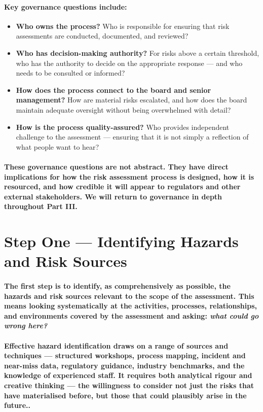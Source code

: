 \paragraph{Key governance questions include:}
\begin{itemize}
    \item{\textbf{Who owns the process?} Who is responsible for ensuring that risk assessments are conducted, documented, and reviewed?}
    \item{\textbf{Who has decision-making authority?} For risks above a certain threshold, who has the authority to decide on the appropriate response — and who needs to be consulted or informed?}
    \item{\textbf{How does the process connect to the board and senior management?} How are material risks escalated, and how does the board maintain adequate oversight without being overwhelmed with detail?}
    \item{\textbf{How is the process quality-assured?} Who provides independent challenge to the assessment — ensuring that it is not simply a reflection of what people want to hear?}
\end{itemize}
\paragraph{These governance questions are not abstract. They have direct implications for how the risk assessment process is designed, how it is resourced, and how credible it will appear to regulators and other external stakeholders. We will return to governance in depth throughout Part III.}

\section{Step One — Identifying Hazards and Risk Sources}
\paragraph{The first step is to identify, as comprehensively as possible, the hazards and risk sources relevant to the scope of the assessment. This means looking systematically at the activities, processes, relationships, and environments covered by the assessment and asking: \textit{what could go wrong here?}}
\paragraph{Effective hazard identification draws on a range of sources and techniques — structured workshops, process mapping, incident and near-miss data, regulatory guidance, industry benchmarks, and the knowledge of experienced staff. It requires both analytical rigour and creative thinking — the willingness to consider not just the risks that have materialised before, but those that could plausibly arise in the future..}
